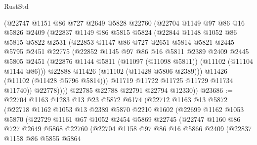 \begin{lexlean}{RustStd}
\begin{coremodule}
            (@22747
              @1151
              @86
              @727
              @2649
              @5828
              @22760
              (@22704
                @1149
                @97
                @86
                @16
                @5826
                @2409
                (@22837
                  @1149
                  @86
                  @5815
                  @5824
                  (@22844
                    @1148
                    @1052
                    @86
                    @5815
                    @5822
                    @2531
                    (@22853
                      @1147
                      @86
                      @727
                      @2651
                      @5814
                      @5821
                      @2445
                      @5795
                      @2451
                      @22775
                      (@22852
                        @1145
                        @97
                        @86
                        @16
                        @5811
                        @2389
                        @2409
                        @2445
                        @5805
                        @2451
                        (@22876 @1144 @5811 (@11097 (@11098 @5811)) (@11102 (@11104 @1144 @86)))
                        @22888
                        @11426
                        (@11102 (@11428 @5806 @2389)))
                      @11426
                      (@11102 (@11428 @5796 @5814)))
                    @11719
                    @11722
                    @11725
                    @11729
                    @11734
                    @11740))
                @22778))))
        @22785
        @22788
        @22791
        @22794
        @12330))
@23686 := @22704
    @1163
    @1283
    @13
    @23
    @5872
    @6174
    (@22712
      @1163
      @13
      @5872
      (@22718
        @1162
        @1053
        @13
        @2389
        @5870
        @2210
        @1602
        (@22699
          @1162
          @1053
          @5870
          (@22729
            @1161
            @67
            @1052
            @2454
            @5869
            @22745
            (@22747
              @1160
              @86
              @727
              @2649
              @5868
              @22760
              (@22704
                @1158
                @97
                @86
                @16
                @5866
                @2409
                (@22837
                  @1158
                  @86
                  @5855
                  @5864

\end{coremodule}
\end{lexlean}
